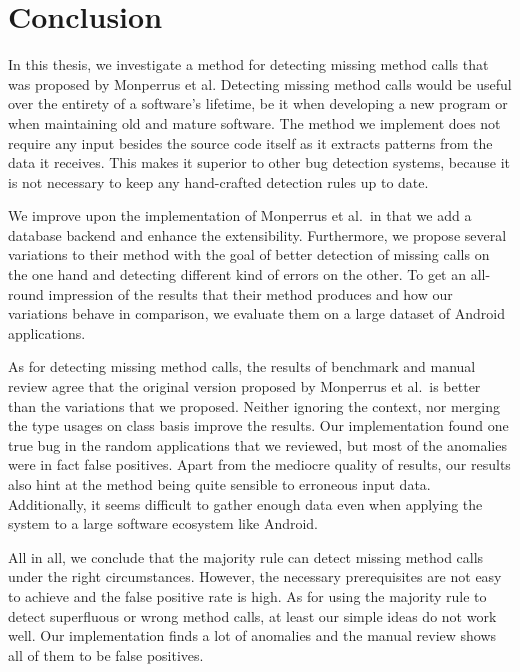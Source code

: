 \chapter{Conclusion}\label{ch:concl}

In this thesis, we investigate a method for detecting missing method calls that was proposed by Monperrus et al.
Detecting missing method calls would be useful over the entirety of a software's lifetime, be it when developing a new program or when maintaining old and mature software.
The method we implement does not require any input besides the source code itself as it extracts patterns from the data it receives.
This makes it superior to other bug detection systems, because it is not necessary to keep any hand-crafted detection rules up to date.

We improve upon the implementation of Monperrus et al.\ in that we add a database backend and enhance the extensibility.
Furthermore, we propose several variations to their method with the goal of better detection of missing calls on the one hand and detecting different kind of errors on the other.
To get an all-round impression of the results that their method produces and how our variations behave in comparison, we evaluate them on a large dataset of Android applications. 

As for detecting missing method calls, the results of benchmark and manual review agree that the original version proposed by Monperrus et al.\ is better than the variations that we proposed.
Neither ignoring the context, nor merging the type usages on class basis improve the results.
Our implementation found one true bug in the random applications that we reviewed, but most of the anomalies were in fact false positives.
Apart from the mediocre quality of results, our results also hint at the method being quite sensible to erroneous input data.
Additionally, it seems difficult to gather enough data even when applying the system to a large software ecosystem like Android.

All in all, we conclude that the majority rule can detect missing method calls under the right circumstances.
However, the necessary prerequisites are not easy to achieve and the false positive rate is high.
As for using the majority rule to detect superfluous or wrong method calls, at least our simple ideas do not work well.
Our implementation finds a lot of anomalies and the manual review shows all of them to be false positives.

